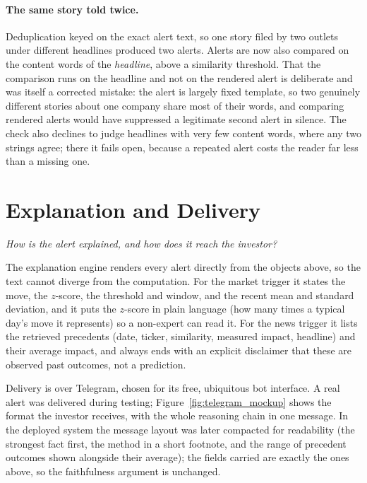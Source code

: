 \paragraph{The same story told twice.} Deduplication keyed on the exact alert text, so one story
filed by two outlets under different headlines produced two alerts. Alerts are now also compared on
the content words of the \emph{headline}, above a similarity threshold. That the comparison runs on
the headline and not on the rendered alert is deliberate and was itself a corrected mistake: the
alert is largely fixed template, so two genuinely different stories about one company share most of
their words, and comparing rendered alerts would have suppressed a legitimate second alert in
silence. The check also declines to judge headlines with very few content words, where any two
strings agree; there it fails open, because a repeated alert costs the reader far less than a
missing one.

\section{Explanation and Delivery}
\label{sec:investigator_xai}

\emph{How is the alert explained, and how does it reach the investor?}

The explanation engine renders every alert directly from the objects above, so the text cannot diverge from
the computation. For the market trigger it states the move, the $z$-score, the threshold and window, and the
recent mean and standard deviation, and it puts the $z$-score in plain language (how many times a typical
day's move it represents) so a non-expert can read it. For the news trigger it lists the retrieved
precedents (date, ticker, similarity, measured impact, headline) and their average impact, and always ends
with an explicit disclaimer that these are observed past outcomes, not a prediction.

Delivery is over Telegram, chosen for its free, ubiquitous bot interface. A real alert was delivered during
testing; Figure~\ref{fig:telegram_mockup} shows the format the investor receives, with the whole reasoning
chain in one message. In the deployed system the message layout was later compacted for readability
(the strongest fact first, the method in a short footnote, and the range of precedent outcomes shown
alongside their average); the fields carried are exactly the ones above, so the faithfulness argument
is unchanged.

